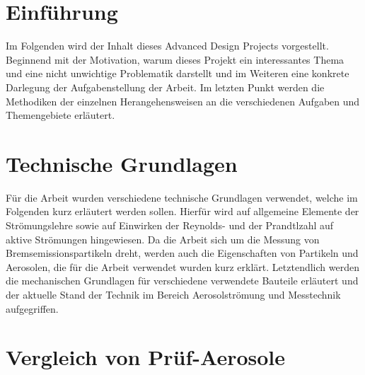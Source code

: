 \chapter{Einf\"{u}hrung}\label{ch:introduction}
Im Folgenden wird der Inhalt dieses Advanced Design Projects vorgestellt. Beginnend mit der Motivation, warum dieses Projekt ein interessantes Thema und eine nicht unwichtige Problematik darstellt und im Weiteren eine konkrete Darlegung der Aufgabenstellung der Arbeit. Im letzten Punkt werden die Methodiken der einzelnen Herangehensweisen an die verschiedenen Aufgaben und Themengebiete erl\"{a}utert. 






\chapter{Technische Grundlagen}\label{ch:foundations}
F\"{u}r die Arbeit wurden verschiedene technische Grundlagen verwendet, welche im Folgenden kurz erl\"{a}utert werden sollen. Hierf\"{u}r wird auf allgemeine Elemente der Str\"{o}mungslehre sowie auf Einwirken der Reynolds- und der Prandtlzahl auf aktive Str\"{o}mungen hingewiesen. Da die Arbeit sich um die Messung von Bremsemissionspartikeln dreht, werden auch die Eigenschaften von Partikeln und Aerosolen, die f\"{u}r die Arbeit verwendet wurden kurz erkl\"{a}rt. Letztendlich werden die mechanischen Grundlagen f\"{u}r verschiedene verwendete Bauteile erl\"{a}utert und der aktuelle Stand der Technik im Bereich Aerosolstr\"{o}mung und Messtechnik aufgegriffen.







\chapter{Vergleich von Pr\"{u}f-Aerosole}\label{ch:aerosol}






